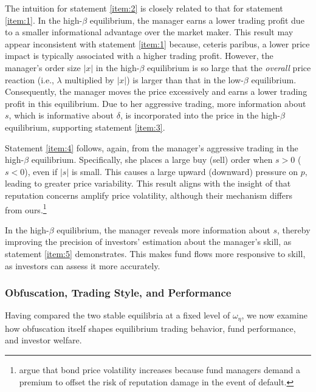 The intuition for statement \ref{item:2} is closely related to that for statement \ref{item:1}. In the high-$\beta$ equilibrium, the manager earns a lower trading profit due to a smaller informational advantage over the market maker. This result may appear inconsistent with statement \ref{item:1} because, ceteris paribus, a lower price impact is typically associated with a higher trading profit. However, the manager's order size $|x|$ in the high-$\beta$ equilibrium is so large that the {\it overall} price reaction (i.e., $\lambda$ multiplied by $|x|$) is larger than that in the low-$\beta$ equilibrium. Consequently, the manager moves the price excessively and earns a lower trading profit in this equilibrium.
Due to her aggressive trading, more information about $s$, which is informative about $\delta$, is incorporated into the price in the high-$\beta$ equilibrium, supporting statement \ref{item:3}.

Statement \ref{item:4} follows, again, from the manager's aggressive trading in the high-$\beta$ equilibrium. Specifically, she places a large buy (sell) order when $s>0$ ($s<0$), even if $|s|$ is small. This causes a large upward (downward) pressure on $p$, leading to greater price variability. This result aligns with the insight of \citet{guerrieri2012fund} that reputation concerns amplify price volatility, although their mechanism differs from ours.\footnote{\citet{guerrieri2012fund} argue that bond price volatility increases because fund managers demand a premium to offset the risk of reputation damage in the event of default.}

In the high-$\beta$ equilibrium, the manager reveals more information about $s$, thereby improving the precision of investors' estimation about the manager's skill, as statement \ref{item:5} demonstrates. This makes fund flows more responsive to skill, as investors can assess it more accurately.

\subsubsection{Obfuscation, Trading Style, and Performance}\label{sss:opacity_style_perf}
Having compared the two stable equilibria at a fixed level of $\omega_{\eta}$, we now examine how obfuscation itself shapes equilibrium trading behavior, fund performance, and investor welfare.


